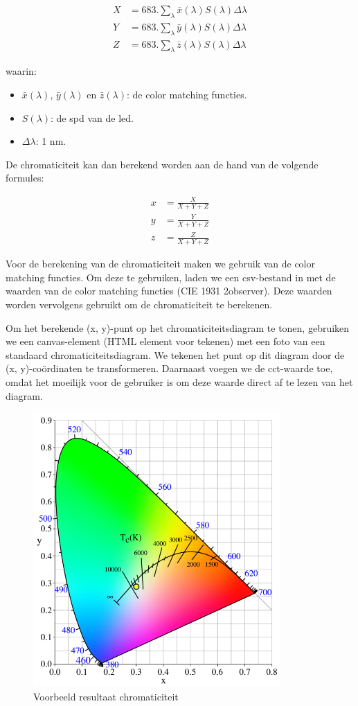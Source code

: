 \begin{align}
    X &= 683.\sum_{\lambda} \bar{x}(\lambda) S(\lambda) \Delta \lambda \\
    Y &= 683.\sum_{\lambda} \bar{y}(\lambda) S(\lambda) \Delta \lambda \\
    Z &= 683.\sum_{\lambda} \bar{z}(\lambda) S(\lambda) \Delta \lambda
\end{align}

waarin:

\begin{itemize}
    \item \(\bar{x}(\lambda)\), \(\bar{y}(\lambda)\) en \(\bar{z}(\lambda)\): de color matching functies.
    \item \(S(\lambda)\): de \gls{spd} van de \gls{led}.
    \item \(\Delta \lambda\): 1 nm.
\end{itemize}

De chromaticiteit kan dan berekend worden aan de hand van de volgende formules:

\begin{align}
    x &= \frac{X}{X + Y + Z} \\
    y &= \frac{Y}{X + Y + Z} \\
    z &= \frac{Z}{X + Y + Z}
\end{align}

Voor de berekening van de chromaticiteit maken we gebruik van de color matching functies. Om deze te gebruiken, laden we een \gls{csv}-bestand in met de waarden van de color matching functies (CIE 1931 2\textdegree observer). Deze waarden worden vervolgens gebruikt om de chromaticiteit te berekenen.

Om het berekende (x, y)-punt op het chromaticiteitsdiagram te tonen, gebruiken we een canvas-element (HTML element voor tekenen) met een foto van een standaard chromaticiteitsdiagram. We tekenen het punt op dit diagram door de (x, y)-co\"ordinaten te transformeren. Daarnaast voegen we de \gls{cct}-waarde toe, omdat het moeilijk voor de gebruiker is om deze waarde direct af te lezen van het diagram.

\begin{figure}[H]
    \centering
    \includegraphics[width=0.5\linewidth]{figs/chromaticiteit_getekend.png}
    \caption{Voorbeeld resultaat chromaticiteit}%
    \label{fig:chromaticity_result}
\end{figure}

